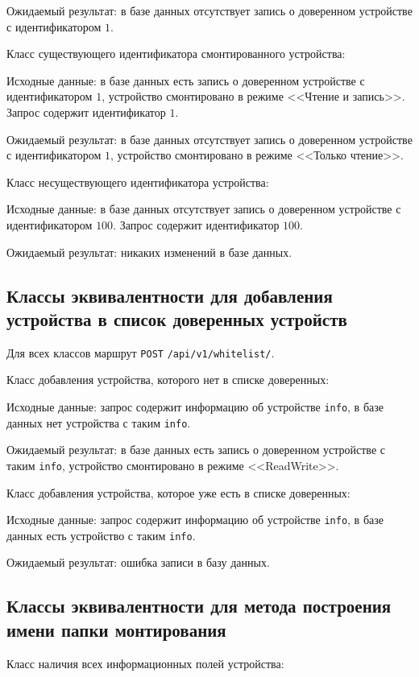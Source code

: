 Ожидаемый результат: в базе данных отсутствует запись о доверенном устройстве с идентификатором $1$.

Класс существующего идентификатора смонтированного устройства:

Исходные данные: в базе данных есть запись о доверенном устройстве с идентификатором $1$, устройство смонтировано в режиме <<Чтение и запись>>. Запрос содержит идентификатор $1$.

Ожидаемый результат: в базе данных отсутствует запись о доверенном устройстве с идентификатором $1$, устройство смонтировано в режиме <<Только чтение>>.

Класс несуществующего идентификатора устройства:

Исходные данные: в базе данных отсутствует запись о доверенном устройстве с идентификатором $100$. Запрос содержит идентификатор $100$.

Ожидаемый результат: никаких изменений в базе данных.

\subsection{Классы эквивалентности для добавления устройства в список доверенных устройств}

Для всех классов маршрут \texttt{POST} \texttt{/api/v1/whitelist/}.

Класс добавления устройства, которого нет в списке доверенных:

Исходные данные: запрос содержит информацию об устройстве \texttt{info}, в базе данных нет устройства с таким \texttt{info}.

Ожидаемый результат: в базе данных есть запись о доверенном устройстве с таким \texttt{info}, устройство смонтировано в режиме <<ReadWrite>>.

Класс добавления устройства, которое уже есть в списке доверенных:

Исходные данные: запрос содержит информацию об устройстве \texttt{info}, в базе данных есть устройство с таким \texttt{info}.

Ожидаемый результат: ошибка записи в базу данных.

\subsection{Классы эквивалентности для метода построения имени папки монтирования}

Класс наличия всех информационных полей устройства:

